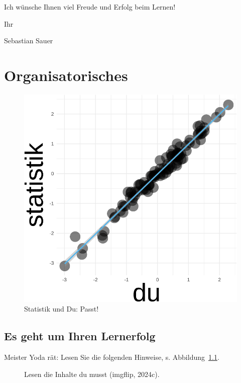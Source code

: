\documentclass[
  letterpaper,
  twoside,
  open=any]{scrbook}
\theoremstyle{definition}
\theoremstyle{definition}
\theoremstyle{definition}
\theoremstyle{remark}
\begin{document}
Ich wünsche Ihnen viel Freude und Erfolg beim Lernen!

Ihr

Sebastian Sauer

\clearpage 
\setcounter{tocdepth}{1}
\tableofcontents 


\chapter{Organisatorisches}\label{organisatorisches}

\begin{figure}[H]

{\centering \includegraphics[width=0.33\linewidth,height=\textheight,keepaspectratio]{005-orga_files/figure-pdf/statistik-und-du-guter-fit-1.pdf}

}

\caption{Statistik und Du: Passt!}

\end{figure}%

\section{Es geht um Ihren Lernerfolg}\label{es-geht-um-ihren-lernerfolg}

Meister Yoda rät: Lesen Sie die folgenden Hinweise, s.
Abbildung~\ref{fig-yoda}.

\begin{figure}


\caption{\label{fig-yoda}Lesen die Inhalte du musst (imgflip, 2024c).}

\end{figure}%
\end{document}
